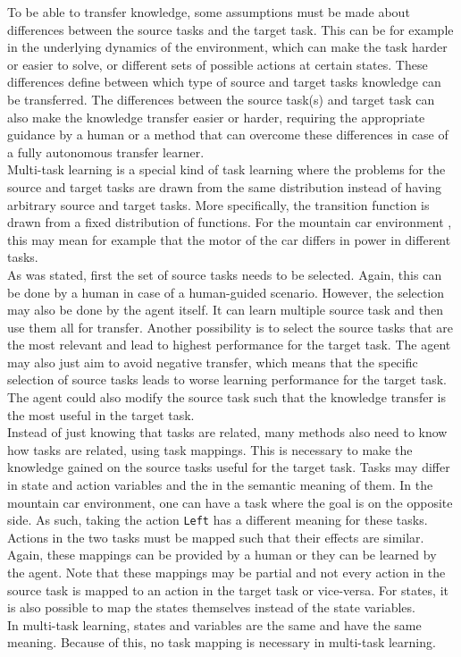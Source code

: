 \documentclass[a4paper]{article}
\begin{document}
To be able to transfer knowledge, some assumptions must be made about differences between the source tasks and the target task. This can be for example in the underlying dynamics of the environment, which can make the task harder or easier to solve, or different sets of possible actions at certain states. These differences define between which type of source and target tasks knowledge can be transferred. The differences between the source task(s) and target task can also make the knowledge transfer easier or harder, requiring the appropriate guidance by a human or a method that can overcome these differences in case of a fully autonomous transfer learner.\\
Multi-task learning is a special kind of task learning where the problems for the source and target tasks are drawn from the same distribution instead of having arbitrary source and target tasks. More specifically, the transition function is drawn from a fixed distribution of functions. For the mountain car environment , this may mean for example that the motor of the car differs in power in different tasks.\\

As was stated, first the set of source tasks needs to be selected. Again, this can be done by a human in case of a human-guided scenario. However, the selection may also be done by the agent itself. It can learn multiple source task and then use them all for transfer. Another possibility is to select the source tasks that are the most relevant and lead to highest performance for the target task. The agent may also just aim to avoid negative transfer, which means that the specific selection of source tasks leads to worse learning performance for the target task.
The agent could also modify the source task such that the knowledge transfer is the most useful in the target task.\\

Instead of just knowing that tasks are related, many methods also need to know how tasks are related, using task mappings. This is necessary to make the knowledge gained on the source tasks useful for the target task. Tasks may differ in state and action variables and the in the semantic meaning of them. In the mountain car environment, one can have a task where the goal is on the opposite side. As such, taking the action \texttt{Left} has a different meaning for these tasks. Actions in the two tasks must be mapped such that their effects are similar.\\
Again, these mappings can be provided by a human or they can be learned by the agent. Note that these mappings may be partial and not every action in the source task is mapped to an action in the target task or vice-versa. For states, it is also possible to map the states themselves instead of the state variables.\\
In multi-task learning, states and variables are the same and have the same meaning. Because of this, no task mapping is necessary in multi-task learning.\\
\end{document}
